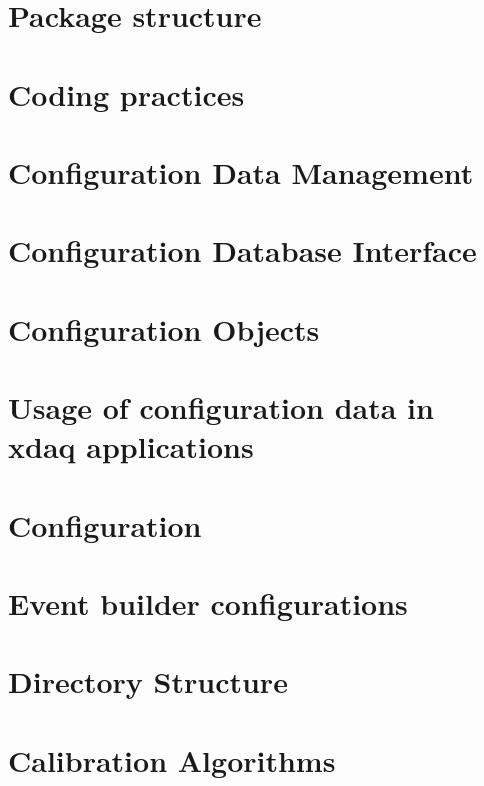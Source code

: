 \documentclass[12pt]{article}
\begin{document}
\section{Package structure}
\label{sect:swcomponets}


\section{Coding practices}


\section{Configuration Data Management}


\section{Configuration Database Interface}


\section{Configuration Objects}
\label{sect:configobjects}


\section{Usage of configuration data in xdaq applications}


\section{Configuration}
\label{sec:configuration}


\section{Event builder configurations}


\section{Directory Structure}
\label{directorystructure}


\section{Calibration Algorithms}
\label{sect:calib}

\end{document}
